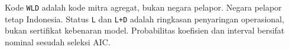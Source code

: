 \documentclass[11pt,a4paper]{article}
\begin{document}
Kode \texttt{WLD} adalah kode mitra agregat, bukan negara pelapor. Negara pelapor tetap Indonesia. Status \texttt{L} dan \texttt{L+D} adalah ringkasan penyaringan operasional, bukan sertifikat kebenaran model. Probabilitas koefisien dan interval bersifat nominal sesudah seleksi AIC.

\clearpage\tableofcontents
\clearpage{}

\clearpage
\clearpage
\clearpage
\clearpage
\clearpage
\clearpage
\clearpage
\clearpage
\clearpage\appendix
\end{document}
